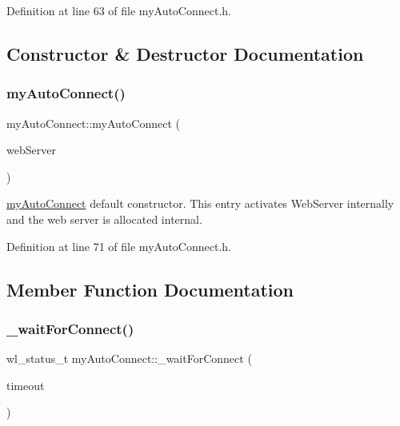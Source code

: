 Definition at line 63 of file my\+Auto\+Connect.\+h.



\subsection{Constructor \& Destructor Documentation}
\mbox{\label{classmy_auto_connect_af01e87d4cd7f2dd7c3ee54f459e7c137}} 
\subsubsection{\texorpdfstring{myAutoConnect()}{myAutoConnect()}}
{\footnotesize\ttfamily my\+Auto\+Connect\+::my\+Auto\+Connect (\begin{DoxyParamCaption}\item[{Web\+Server\+Class \&}]{web\+Server }\end{DoxyParamCaption})\hspace{0.3cm}{\ttfamily [inline]}}

\mbox{\hyperlink{classmy_auto_connect}{my\+Auto\+Connect}} default constructor. This entry activates Web\+Server internally and the web server is allocated internal. 

Definition at line 71 of file my\+Auto\+Connect.\+h.



\subsection{Member Function Documentation}
\mbox{\label{classmy_auto_connect_aa1aaa515c6e27f9fe1073db1122561ca}} 
\subsubsection{\texorpdfstring{\_waitForConnect()}{\_waitForConnect()}}
{\footnotesize\ttfamily wl\+\_\+status\+\_\+t my\+Auto\+Connect\+::\+\_\+wait\+For\+Connect (\begin{DoxyParamCaption}\item[{unsigned long}]{timeout }\end{DoxyParamCaption})\hspace{0.3cm}{\ttfamily [inline]}}

